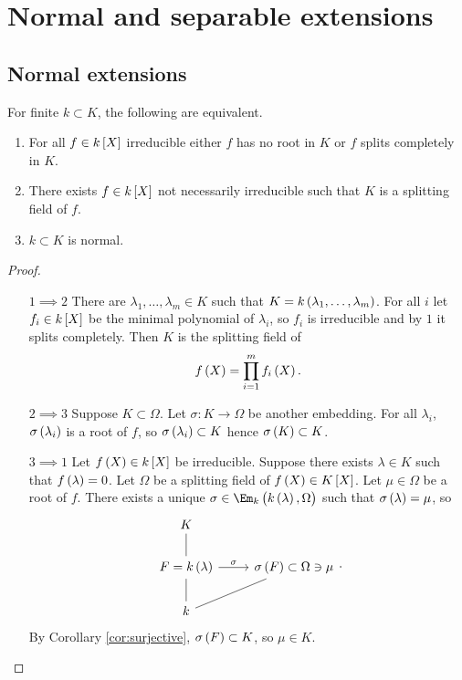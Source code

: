 \pagebreak

\section{Normal and separable extensions}

\subsection{Normal extensions}

\begin{theorem}
For finite $ k \subset K $, the following are equivalent.
\begin{enumerate}
\item For all $ f \in k\sbr{X} $ irreducible either $ f $ has no root in $ K $ or $ f $ splits completely in $ K $.
\item There exists $ f \in k\sbr{X} $ not necessarily irreducible such that $ K $ is a splitting field of $ f $.
\item $ k \subset K $ is normal.
\end{enumerate}
\end{theorem}

\begin{proof}
\hfill
\begin{itemize}[leftmargin=0.5in]
\item[$ 1 \implies 2 $] There are $ \lambda_1, \dots, \lambda_m \in K $ such that $ K = k\br{\lambda_1, \dots, \lambda_m} $. For all $ i $ let $ f_i \in k\sbr{X} $ be the minimal polynomial of $ \lambda_i $, so $ f_i $ is irreducible and by $ 1 $ it splits completely. Then $ K $ is the splitting field of
$$ f\br{X} = \prod_{i = 1}^m f_i\br{X}. $$
\item[$ 2 \implies 3 $] Suppose $ K \subset \Omega $. Let $ \sigma : K \to \Omega $ be another embedding. For all $ \lambda_i $, $ \sigma\br{\lambda_i} $ is a root of $ f $, so $ \sigma\br{\lambda_i} \subset K $ hence $ \sigma\br{K} \subset K $.
\item[$ 3 \implies 1 $] Let $ f\br{X} \in k\sbr{X} $ be irreducible. Suppose there exists $ \lambda \in K $ such that $ f\br{\lambda} = 0 $. Let $ \Omega $ be a splitting field of $ f\br{X} \in K\sbr{X} $. Let $ \mu \in \Omega $ be a root of $ f $. There exists a unique $ \sigma \in \Em_k\br{k\br{\lambda}, \Omega} $ such that $ \sigma\br{\lambda} = \mu $, so
$$
\begin{tikzcd}
K & \\
F = k\br{\lambda} \arrow[dash]{u} \arrow{r}{\sigma} & \sigma\br{F} \subset \Omega \ni \mu \\
k \arrow[dash]{u} \arrow[dash]{ur} &
\end{tikzcd}.
$$
By Corollary \ref{cor:surjective}, $ \sigma\br{F} \subset K $, so $ \mu \in K $.
\end{itemize}
\end{proof}

